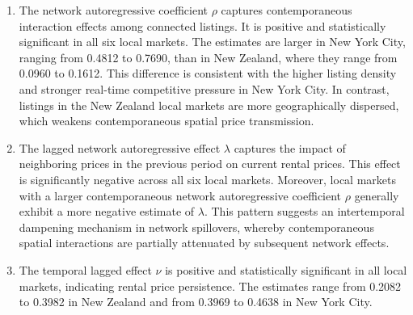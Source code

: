 \documentclass[11pt,a4paper]{article}
\begin{document}
\begin{enumerate}[(1)]
\item The network autoregressive coefficient $\rho$ captures contemporaneous interaction effects among connected listings. It is positive and statistically significant in all six local markets. The estimates are larger in New York City, ranging from 0.4812 to 0.7690, than in New Zealand, where they range from 0.0960 to 0.1612. This difference is consistent with the higher listing density and stronger real-time competitive pressure in New York City. In contrast, listings in the New Zealand local markets are more geographically dispersed, which weakens contemporaneous spatial price transmission.

\item The lagged network autoregressive effect $\lambda$ captures the impact of neighboring prices in the previous period on current rental prices. This effect is significantly negative across all six local markets. Moreover, local markets with a larger contemporaneous network autoregressive coefficient $\rho$ generally exhibit a more negative estimate of $\lambda$. This pattern suggests an intertemporal dampening mechanism in network spillovers, whereby contemporaneous spatial interactions are partially attenuated by subsequent network effects.

\item The temporal lagged effect $\nu$ is positive and statistically significant in all local markets, indicating rental price persistence. The estimates range from 0.2082 to 0.3982 in New Zealand and from 0.3969 to 0.4638 in New York City.
\end{enumerate}
\end{document}
